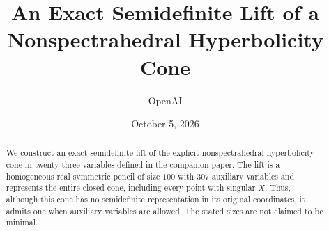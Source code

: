 \documentclass[11pt]{article}
\title{An Exact Semidefinite Lift of a\protect\\Nonspectrahedral Hyperbolicity Cone}
\author{OpenAI}
\date{October 5, 2026}
\theoremstyle{remark}
\begin{document}
\maketitle
\begin{abstract}
We construct an exact semidefinite lift of the explicit nonspectrahedral
hyperbolicity cone in twenty-three variables defined in the companion
paper. The lift is a homogeneous real symmetric pencil of size $100$
with $307$ auxiliary variables and represents the entire closed cone,
including every point with singular $X$. Thus, although this cone has no
semidefinite representation in its original coordinates, it admits one
when auxiliary variables are allowed. The stated sizes are not claimed
to be minimal.
\end{abstract}






\end{document}
